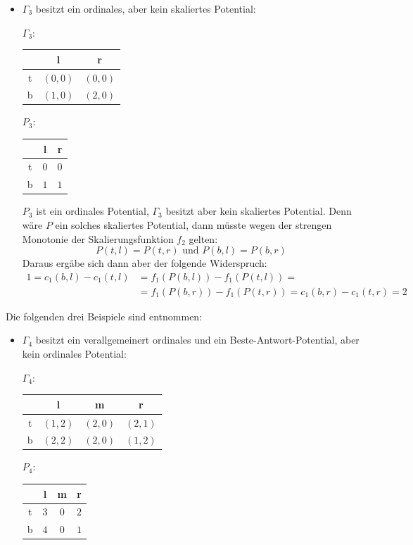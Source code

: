 \begin{bsp}
\begin{itemize}
		\item $\Gamma_3$ besitzt ein ordinales, aber kein skaliertes Potential:
			\begin{center}
				$\Gamma_3:$ \quad
				\begin{tabular}{c||c|c}
					& l 		& r 		\\\hline\hline
					t	& $(0,0)$	& $(0,0)$	\\\hline
					b	& $(1,0)$	& $(2,0)$ 
				\end{tabular}\hspace{5em}
				$P_3:$ \quad
				\begin{tabular}{c||c|c}
					& l 		& r 		\\\hline\hline
					t	& $0$	& $0$	\\\hline
					b	& $1$	& $1$ 
				\end{tabular}
			\end{center}
			$P_3$ ist ein ordinales Potential, $\Gamma_3$ besitzt aber kein skaliertes Potential. Denn wäre $P$ ein solches skaliertes Potential, dann müsste wegen der strengen Monotonie der Skalierungsfunktion $f_2$ gelten:
				\[P(t,l) = P(t,r) \text{ und } P(b,l) = P(b,r)\]
			Daraus ergäbe sich dann aber der folgende Widerspruch:
				\begin{align*}
					1 = c_1(b,l)-c_1(t,l) 	&= f_1(P(b,l)) - f_1(P(t,l)) = \\
											&= f_1(P(b,r)) - f_1(P(t,r)) = c_1(b,r) - c_1(t,r) = 2
				\end{align*}
	\end{itemize}
	Die folgenden drei Beispiele sind \cite[Beispiele 4.1, 4.2 und 4.3]{BestRespPot} entnommen:
	\begin{itemize}
		\item $\Gamma_4$ besitzt ein verallgemeinert ordinales und ein Beste-Antwort-Potential, aber kein ordinales Potential:
			\begin{center}
				$\Gamma_4:$ \quad
				\begin{tabular}{c||c|c|c}
						& l 		& m			& r 		\\\hline\hline
					t	& $(1,2)$	& $(2,0)$ 	& $(2,1)$	\\\hline
					b	& $(2,2)$	& $(2,0)$	& $(1,2)$
				\end{tabular}\hspace{5em}
				$P_4:$ \quad
				\begin{tabular}{c||c|c|c}
						& l 		& m 		& r \\\hline\hline
					t	& $3$	& $0$ 		& $2$	\\\hline
					b	& $4$	& $0$		& $1$

\end{tabular}
\end{center}
\end{itemize}
\end{bsp}

